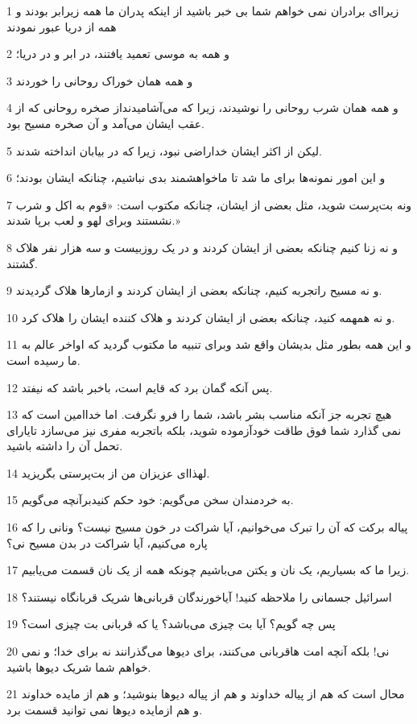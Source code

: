 \par 1 زیرا‌ای برادران نمی خواهم شما بی خبر باشید از اینکه پدران ما همه زیرابر بودند و همه از دریا عبور نمودند
\par 2 و همه به موسی تعمید یافتند، در ابر و در دریا؛
\par 3 و همه همان خوراک روحانی را خوردند
\par 4 و همه همان شرب روحانی را نوشیدند، زیرا که می‌آشامیدنداز صخره روحانی که از عقب ایشان می‌آمد و آن صخره مسیح بود.
\par 5 لیکن از اکثر ایشان خداراضی نبود، زیرا که در بیابان انداخته شدند.
\par 6 و این امور نمونه‌ها برای ما شد تا ماخواهشمند بدی نباشیم، چنانکه ایشان بودند؛
\par 7 ونه بت‌پرست شوید، مثل بعضی از ایشان، چنانکه مکتوب است: «قوم به اکل و شرب نشستند وبرای لهو و لعب برپا شدند.»
\par 8 و نه زنا کنیم چنانکه بعضی از ایشان کردند و در یک روزبیست و سه هزار نفر هلاک گشتند.
\par 9 و نه مسیح راتجربه کنیم، چنانکه بعضی از ایشان کردند و ازمارها هلاک گردیدند.
\par 10 و نه همهمه کنید، چنانکه بعضی از ایشان کردند و هلاک کننده ایشان را هلاک کرد.
\par 11 و این همه بطور مثل بدیشان واقع شد وبرای تنبیه ما مکتوب گردید که اواخر عالم به ما رسیده است.
\par 12 پس آنکه گمان برد که قایم است، باخبر باشد که نیفتد.
\par 13 هیچ تجربه جز آنکه مناسب بشر باشد، شما را فرو نگرفت. اما خداامین است که نمی گذارد شما فوق طاقت خودآزموده شوید، بلکه باتجربه مفری نیز می‌سازد تایارای تحمل آن را داشته باشید.
\par 14 لهذا‌ای عزیزان من از بت‌پرستی بگریزید.
\par 15 به خردمندان سخن می‌گویم: خود حکم کنیدبرآنچه می‌گویم.
\par 16 پیاله برکت که آن را تبرک می‌خوانیم، آیا شراکت در خون مسیح نیست؟ ونانی را که پاره می‌کنیم، آیا شراکت در بدن مسیح نی؟
\par 17 زیرا ما که بسیاریم، یک نان و یکتن می‌باشیم چونکه همه از یک نان قسمت می‌یابیم.
\par 18 اسرائیل جسمانی را ملاحظه کنید! آیاخورندگان قربانی‌ها شریک قربانگاه نیستند؟
\par 19 پس چه گویم؟ آیا بت چیزی می‌باشد؟ یا که قربانی بت چیزی است؟
\par 20 نی! بلکه آنچه امت هاقربانی می‌کنند، برای دیوها می‌گذرانند نه برای خدا؛ و نمی خواهم شما شریک دیوها باشید.
\par 21 محال است که هم از پیاله خداوند و هم از پیاله دیوها بنوشید؛ و هم از مایده خداوند و هم ازمایده دیوها نمی توانید قسمت برد.
